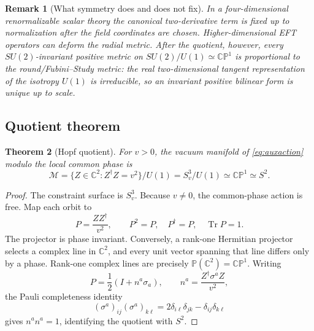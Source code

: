 \documentclass[11pt]{article}
\numberwithin{equation}{section}
\newcommand{\CP}{\mathbb{CP}}
\newcommand{\CC}{\mathbb C}
\newcommand{\Tr}{\operatorname{Tr}}
\newtheorem{theorem}{Theorem}[section]
\newtheorem{remark}[theorem]{Remark}
\begin{document}
\begin{remark}[What symmetry does and does not fix]
In a four-dimensional renormalizable scalar theory the canonical two-derivative
term is fixed up to normalization after the field coordinates are chosen.
Higher-dimensional EFT operators can deform the radial metric.  After the
quotient, however, every \(SU(2)\)-invariant positive metric on
\(SU(2)/U(1)\simeq\CP^1\) is proportional to the round/Fubini--Study metric:
the real two-dimensional tangent representation of the isotropy \(U(1)\) is
irreducible, so an invariant positive bilinear form is unique up to scale.
\end{remark}

\subsection{Quotient theorem}

\begin{theorem}[Hopf quotient]
\label{thm:hopfquotient}
For \(v>0\), the vacuum manifold of \eqref{eq:auxaction} modulo the local
common phase is
\begin{equation}
 \mathcal M=\{Z\in\CC^2:Z^\dagger Z=v^2\}/U(1)
 =S^3_v/U(1)\simeq\CP^1\simeq S^2.
 \label{eq:hopfquotient}
\end{equation}
\end{theorem}

\begin{proof}
The constraint surface is \(S^3_v\).  Because \(v\ne0\), the common-phase
action is free.  Map each orbit to
\begin{equation}
 P=\frac{ZZ^\dagger}{v^2},
 \qquad P^2=P,\quad P^\dagger=P,\quad \Tr P=1.
 \label{eq:projector}
\end{equation}
The projector is phase invariant.  Conversely, a rank-one Hermitian projector
selects a complex line in \(\CC^2\), and every unit vector spanning that line
differs only by a phase.  Rank-one complex lines are precisely
\(\mathbb P(\CC^2)=\CP^1\).  Writing
\begin{equation}
 P=\frac12(I+n^a\sigma_a),
 \qquad n^a=\frac{Z^\dagger\sigma^a Z}{v^2},
 \label{eq:hopfmap}
\end{equation}
the Pauli completeness identity
\begin{equation}
 (\sigma^a)_{ij}(\sigma^a)_{k\ell}
 =2\delta_{i\ell}\delta_{jk}-\delta_{ij}\delta_{k\ell}
\end{equation}
gives \(n^an^a=1\), identifying the quotient with \(S^2\).
\end{proof}
\end{document}
